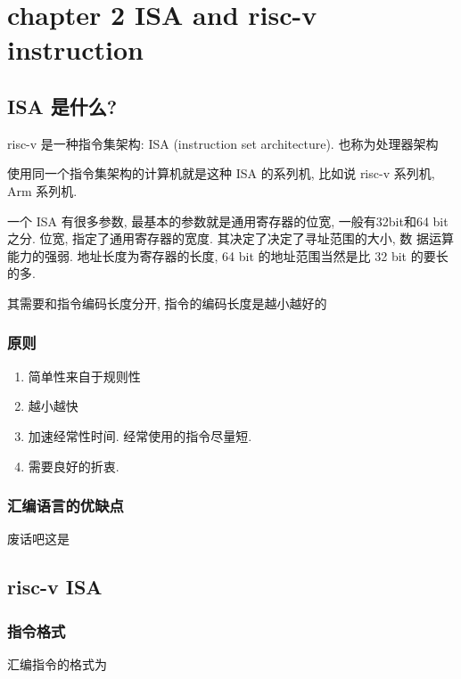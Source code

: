 \documentclass[11pt]{article}
\date{\today}
\title{}
\begin{document}
\tableofcontents

\section{chapter 2 ISA and risc-v instruction}
\label{sec:org6d48388}
\subsection{ISA 是什么?}
\label{sec:orgb6df826}

risc-v 是一种指令集架构: ISA (instruction set architecture). 也称为处理器架构

使用同一个指令集架构的计算机就是这种 ISA 的系列机, 比如说 risc-v 系列机, Arm 系列机.  


一个 ISA 有很多参数, 最基本的参数就是通用寄存器的位宽, 一般有32bit和64
bit之分. 位宽, 指定了通用寄存器的宽度. 其决定了决定了寻址范围的大小, 数
据运算能力的强弱. 地址长度为寄存器的长度, 64 bit 的地址范围当然是比 32
bit 的要长的多. 

其需要和指令编码长度分开, 指令的编码长度是越小越好的

\subsubsection{原则}
\label{sec:org039fef6}

\begin{enumerate}
\item 简单性来自于规则性
\item 越小越快
\item 加速经常性时间.  经常使用的指令尽量短.
\item 需要良好的折衷.
\end{enumerate}


\subsubsection{汇编语言的优缺点}
\label{sec:org372c34d}

废话吧这是

\subsection{risc-v ISA}
\label{sec:org828b6f7}

\subsubsection{指令格式}
\label{sec:orgc590ab9}
汇编指令的格式为 
\end{document}
